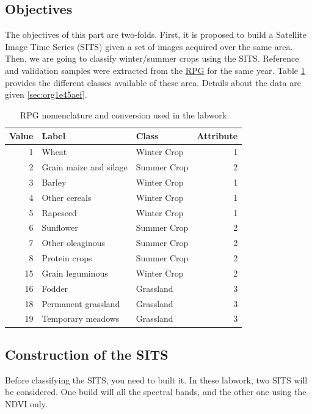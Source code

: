 \documentclass[a4paper,11pt,DIV=18]{scrartcl}
\begin{document}
\subsection{Objectives}
\label{sec:orgc46e378}
The objectives  of this part are  two-folds. First, it is  proposed to
build  a Satellite  Image Time  Series (SITS)  given a  set of  images
acquired  over  the  same  area.   Then,  we  are  going  to  classify
winter/summer crops  using the SITS. Reference  and validation samples
were extracted from the \href{https://www.data.gouv.fr/fr/datasets/registre-parcellaire-graphique-2012-contours-des-ilots-culturaux-et-leur-groupe-de-cultures-majorita/}{RPG} for  the same year. Table \ref{tab:orgd32f738} provides
the different classes available of  these area. Details about the data
are given \ref{sec:org1e45aef}.

\begin{table}[htbp]
\caption{\label{tab:orgd32f738}
RPG nomenclature and conversion used in the labwork}
\centering
\begin{tabular}{rllr}
\toprule
Value & Label & Class & Attribute\\
\midrule
1 & Wheat & Winter Crop & 1\\
2 & Grain maize and silage & Summer Crop & 2\\
3 & Barley & Winter Crop & 1\\
4 & Other cereals & Winter Crop & 1\\
5 & Rapeseed & Winter Crop & 1\\
6 & Sunflower & Summer Crop & 2\\
7 & Other oleaginous & Summer Crop & 2\\
8 & Protein crops & Summer Crop & 2\\
15 & Grain leguminous & Winter Crop & 2\\
16 & Fodder & Grassland & 3\\
18 & Permanent grassland & Grassland & 3\\
19 & Temporary meadows & Grassland & 3\\
\bottomrule
\end{tabular}
\end{table}

\subsection{Construction of the SITS}
\label{sec:org4a1ac8c}
Before classifying the  SITS, you need to built it.  In these labwork,
two SITS  will be considered. One  build will all the  spectral bands,
and the other one using the NDVI only.
\end{document}
